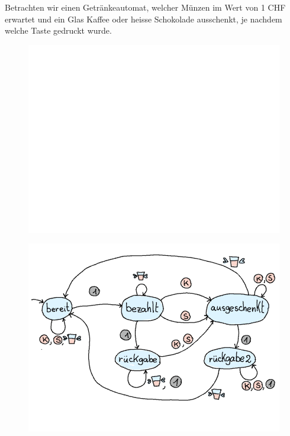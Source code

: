 \documentclass{article}
\begin{document}
\begin{example}
Betrachten wir einen Getränkeautomat, welcher Münzen im Wert von 1 CHF erwartet und ein Glas Kaffee oder heisse Schokolade ausschenkt, je nachdem welche Taste gedruckt wurde.
\begin{figure}[H]
\centering
\includegraphics[width=0.6\linewidth]{Pictures/weiss.png} 
\end{figure}
\end{example}

\begin{examplesolution}
\begin{figure}[H]
\centering
\includegraphics[width=0.6\linewidth]{Pictures/Getraenkeautomat.png} 
\end{figure}
\end{examplesolution}
\end{document}
